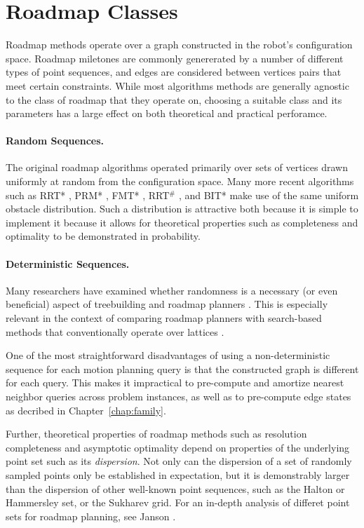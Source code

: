 \section{Roadmap Classes}
\label{sec:roadmaps:roadmap-classes}

Roadmap methods operate over a graph constructed in the
robot's configuration space.
Roadmap miletones are commonly genererated by a number of different
types of point sequences,
and edges are considered between vertices pairs that meet
certain constraints.
While most algorithms methods are generally agnostic
to the class of roadmap that they operate on,
choosing a suitable class and its parameters has a large effect
on both theoretical and practical perforamce.

\paragraph{Random Sequences.}
The original roadmap algorithms
\citep{kavrakietal1996prm}
operated primarily over sets
of vertices drawn uniformly at random from the configuration space.
Many more recent algorithms such as
RRT* \citep{karaman2010rrtstar},
PRM* \citep{karaman2011samplingoptimal},
FMT* \citep{janson2015fmtstar},
RRT$^{\#}$ \citep{arslan2013rrtsharp},
and BIT* \citep{gammell2015bitstar} make use of the same
uniform obstacle distribution.
Such a distribution is attractive both because
it is simple to implement
it because it allows for theoretical properties such as
completeness and optimality to be demonstrated
in probability.

\paragraph{Deterministic Sequences.}
Many researchers have examined whether randomness is a necessary
(or even beneficial) aspect of treebuilding and roadmap planners
\citep{branicky2002detvsprobroadmaps}.
This is especially relevant in the context of comparing
roadmap planners with search-based methods
that conventionally operate over lattices \citep{lavalle2002gridprms}.

One of the most straightforward disadvantages of using a
non-deterministic sequence for each motion planning query
is that the constructed graph is different for each query.
This makes it impractical to pre-compute and amortize nearest
neighbor queries across problem instances,
as well as to pre-compute edge states as decribed in
Chapter~\ref{chap:family}.

Further,
theoretical properties of roadmap methods
such as resolution completeness and asymptotic optimality
depend on properties of the underlying point set
such as its \emph{dispersion}.
Not only can the dispersion of a set of randomly sampled points
only be established in expectation,
but it is demonstrably larger than the dispersion of other
well-known point sequences,
such as the Halton or Hammersley set,
or the Sukharev grid.
For an in-depth analysis of differet point sets for roadmap
planning, see Janson \citep{janson2015deterministicsampling}.

